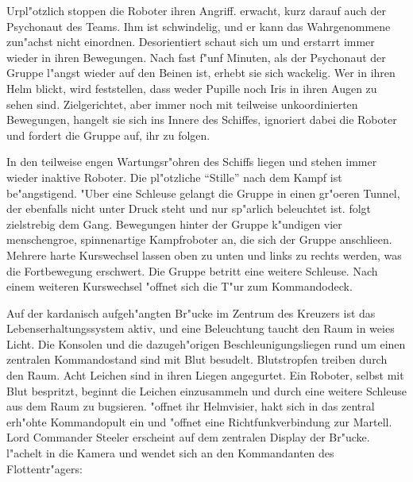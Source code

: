 Urpl"otzlich stoppen die Roboter ihren Angriff. \xl{} erwacht, kurz darauf auch der Psychonaut des Teams. Ihm ist schwindelig, und er kann das Wahrgenommene zun"achst nicht einordnen. Desorientiert schaut sich \xl{} um und erstarrt immer wieder in ihren Bewegungen. Nach fast f"unf Minuten, als der Psychonaut der Gruppe l"angst wieder auf den Beinen ist, erhebt sie sich wackelig. Wer in ihren Helm blickt, wird feststellen, dass weder Pupille noch Iris in ihren Augen zu sehen sind. Zielgerichtet, aber immer noch mit teilweise unkoordinierten Bewegungen, hangelt sie sich ins Innere des Schiffes, ignoriert dabei die Roboter und fordert die Gruppe auf, ihr zu folgen.


In den teilweise engen Wartungsr"ohren des Schiffs liegen und stehen immer wieder inaktive Roboter. Die pl"otzliche ``Stille'' nach dem Kampf ist be"angstigend. "Uber eine Schleuse gelangt die Gruppe in einen gr"o\3eren Tunnel, der ebenfalls nicht unter Druck steht und nur sp"arlich beleuchtet ist. \xl{} folgt zielstrebig dem Gang. Bewegungen hinter der Gruppe k"undigen vier menschengro\3e, spinnenartige Kampfroboter an, die sich der Gruppe anschlie\3en. Mehrere harte Kurswechsel lassen oben zu unten und links zu rechts werden, was die Fortbewegung erschwert. Die Gruppe betritt eine weitere Schleuse. Nach einem weiteren Kurswechsel "offnet sich die T"ur zum Kommandodeck.

Auf der kardanisch aufgeh"angten Br"ucke im Zentrum des Kreuzers ist das Lebenserhaltungssystem aktiv, und eine Beleuchtung taucht den Raum in wei\3es Licht. Die Konsolen und die dazugeh"origen Beschleunigungsliegen rund um einen zentralen Kommandostand sind mit Blut besudelt. Blutstropfen treiben durch den Raum. Acht Leichen sind in ihren Liegen angegurtet. Ein Roboter, selbst mit Blut bespritzt, beginnt die Leichen einzusammeln und durch eine weitere Schleuse aus dem Raum zu bugsieren. \xl{} "offnet ihr Helmvisier, hakt sich in das zentral erh"ohte Kommandopult ein und "offnet eine Richtfunkverbindung zur Martell. Lord Commander Steeler erscheint auf dem zentralen Display der Br"ucke. \xl{} l"achelt in die Kamera und wendet sich an den Kommandanten des Flottentr"agers:


